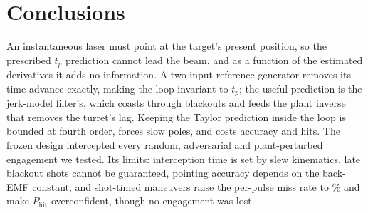 \documentclass[conference]{IEEEtran}
\begin{document}
\section{Conclusions}
An instantaneous laser must point at the target's present position, so the prescribed $t_p$ prediction cannot lead the beam, and as a function of the estimated derivatives it adds no information. A two-input reference generator removes its time advance exactly, making the loop invariant to $t_p$; the useful prediction is the jerk-model filter's, which coasts through blackouts and feeds the plant inverse that removes the turret's lag. Keeping the Taylor prediction inside the loop is bounded at fourth order, forces slow poles, and costs accuracy and hits. The frozen design intercepted every random, adversarial and plant-perturbed engagement we tested. Its limits: interception time is set by slew kinematics, late blackout shots cannot be guaranteed, pointing accuracy depends on the back-EMF constant, and shot-timed maneuvers raise the per-pulse miss rate to \hgMissRate\% and make $P_{\mathrm{hit}}$ overconfident, though no engagement was lost.



\end{document}
